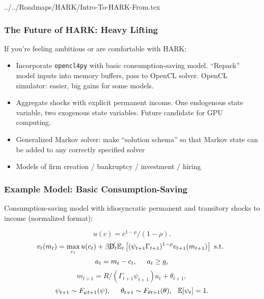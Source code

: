 \documentclass[11ptt]{beamer}
\newcommand{\bi}{\begin{itemize}}
\newcommand{\ei}{\end{itemize}}
\begin{document}
\begin{verbatimwrite}{../../Roadmaps/HARK/Intro-To-HARK-From.tex}
  \begin{frame}
    \frametitle{The Future of HARK: Heavy Lifting}
    If you're feeling ambitious or are comfortable with HARK:
    \bi
  \item <1->Incorporate \texttt{opencl4py} with basic consumption-saving model.  ``Repack'' model inputs into memory buffers, pass to OpenCL solver.  OpenCL simulator: easier, big gains for some models.

  \item <2->Aggregate shocks with explicit permanent income.  One endogenous state variable, two exogenous state variables.  Future candidate for GPU computing.

  \item <3->Generalized Markov solver: make ``solution schema'' so that Markov state can be added to any correctly specified solver

  \item <4->Models of firm creation / bankruptcy / investment / hiring
    \ei

    \hyperlink{DiscussionTopics}{}
  \end{frame}


\end{verbatimwrite}


\begin{frame}\label{ModelMath}
  \frametitle{Example Model: Basic Consumption-Saving}

  Consumption-saving model with idiosyncratic permanent and transitory shocks to income (normalized format):

  \begin{equation*}
    u(c) = c^{1-\rho}/(1-\rho).
  \end{equation*}
  \begin{equation*}
    v_t(m_t) = \max_{c_t} u(c_t) + \beta \cancel{\mathsf{D}}_t \mathbb{E}_t \left[(\psi_{t+1} \Gamma_{t+1})^{1-\rho} v_{t+1}(m_{t+1}) \right] \text{ s.t. }
  \end{equation*}
  \begin{equation*}
    a_t = m_t - c_t, \hspace{0.5cm} a_t \geq \underline{a},
  \end{equation*}
  \begin{equation*}
    m_{t+1} = R/(\Gamma_{t+1} \psi_{t+1}) a_t + \theta_{t+1}, 
  \end{equation*}
  \begin{equation*}
    \psi_{t+1} \sim F_{\psi t+1}(\psi), \hspace{0.5cm} \theta_{t+1} \sim F_{\theta t+1}(\theta), \hspace{0.25cm} \mathbb{E}[\psi_t] = 1.
  \end{equation*}
\end{frame}
\end{document}
